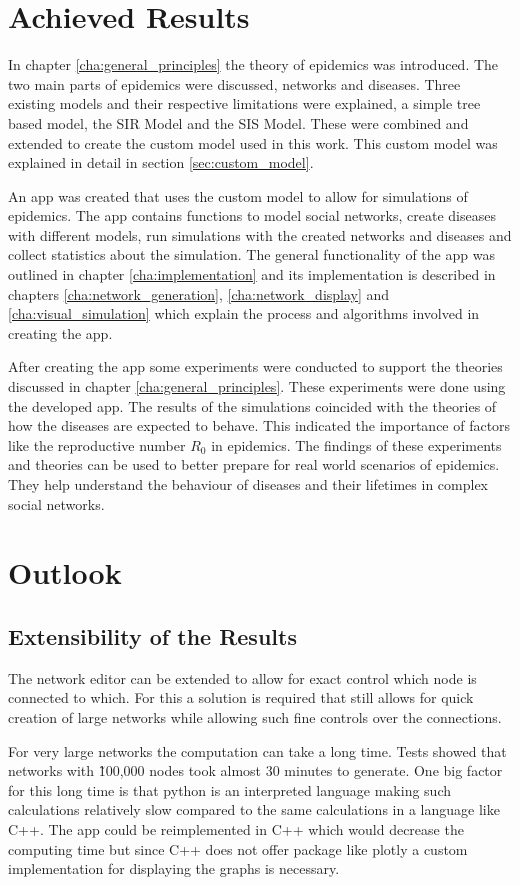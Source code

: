 \section{Achieved Results}
In chapter \ref{cha:general_principles} the theory of epidemics was introduced. The two
main parts of epidemics were discussed, networks and diseases. Three existing models 
and their respective limitations were explained, a simple tree based model, the SIR Model
and the SIS Model. These were  combined and extended to create the custom model used in
this work. This custom model was explained in detail in section \ref{sec:custom_model}.

An app was created that uses the custom model to allow for simulations of epidemics. The
app contains functions to model social networks, create diseases with different models,
run simulations with the created networks and diseases and collect statistics about the
simulation. 
The general functionality of the app was outlined in chapter \ref{cha:implementation}
and its implementation is described in chapters \ref{cha:network_generation}, 
\ref{cha:network_display} and \ref{cha:visual_simulation} which
explain the process and algorithms involved in creating the app.

After creating the app some experiments were conducted to support the theories discussed in
chapter \ref{cha:general_principles}. These experiments were done using the developed app.
The results of the simulations coincided with the theories of how the diseases are 
expected to behave. This indicated the importance of factors like the reproductive number
$R_0$ in epidemics. The findings of these experiments and theories can be used to better
prepare for real world scenarios of epidemics. They help understand the behaviour of diseases
and their lifetimes in complex social networks.

\section{Outlook}
\subsection{Extensibility of the Results}
The network editor can be extended to allow for exact control which node is connected to which.
For this a solution is required that still allows for quick creation of large networks while
allowing such fine controls over the connections.

For very large networks the computation can take a long time. Tests showed that networks 
with \~100,000 nodes took almost 30 minutes to generate. One big factor for this long time
is that python is an interpreted language making such calculations relatively slow compared
to the same calculations in a language like C++. The app could be reimplemented in C++ which
would decrease the computing time but since C++ does not offer package like plotly a custom
implementation for displaying the graphs is necessary.

